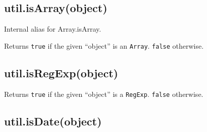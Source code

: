 \subsection{util.isArray(object)}\label{util.isarrayobject}

Internal alias for Array.isArray.

Returns \texttt{true} if the given ``object'' is an \texttt{Array}.
\texttt{false} otherwise.

\begin{Shaded}
\begin{Highlighting}[]
 \NormalTok{(}\NormalTok{);}

\NormalTok{([])}
\NormalTok{(} 
\NormalTok{(\{\})}
\end{Highlighting}
\end{Shaded}

\subsection{util.isRegExp(object)}\label{util.isregexpobject}

Returns \texttt{true} if the given ``object'' is a \texttt{RegExp}.
\texttt{false} otherwise.

\begin{Shaded}
\begin{Highlighting}[]
 \NormalTok{(}\NormalTok{);}

\NormalTok{(}\NormalTok{)}
\NormalTok{(} \NormalTok{(}\NormalTok{))}
\NormalTok{(\{\})}
\end{Highlighting}
\end{Shaded}

\subsection{util.isDate(object)}\label{util.isdateobject}

